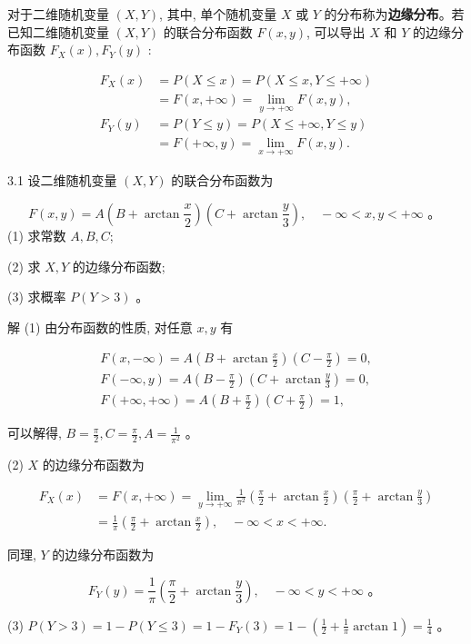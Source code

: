 \documentclass{beamer}
\begin{document}
	\begin{frame}
		对于二维随机变量 $(X, Y)$, 其中, 单个随机变量 $X$ 或 $Y$ 的分布称为\textbf{边缘分布}。若 已知二维随机变量 $(X, Y)$ 的联合分布函数 $F(x, y)$, 可以导出 $X$ 和 $Y$ 的边缘分布函数 $F_{X}(x), F_{Y}(y)$ :
		
		$$
		\begin{aligned}
			F_{X}(x) & =P(X \leqslant x)=P(X \leqslant x, Y \leqslant+\infty) \\
			& =F(x,+\infty)=\lim _{y \rightarrow+\infty} F(x, y), \\
			F_{Y}(y) & =P(Y \leqslant y)=P(X \leqslant+\infty, Y \leqslant y) \\
			& =F(+\infty, y)=\lim _{x \rightarrow+\infty} F(x, y) .
		\end{aligned}
		$$
	\end{frame}
	 
	\begin{frame}
		3.1 设二维随机变量 $(X, Y)$ 的联合分布函数为
		
		$$
		F(x, y)=A\left(B+\arctan \frac{x}{2}\right)\left(C+\arctan \frac{y}{3}\right), \quad-\infty<x, y<+\infty \text { 。 }
		$$
		(1) 求常数 $A, B, C$; 
		
		(2) 求 $X, Y$ 的边缘分布函数;
		
		(3) 求概率 $P(Y>3)$ 。
	\end{frame}
	
	\begin{frame}
		解 (1) 由分布函数的性质, 对任意 $x, y$ 有
		
		$$
		\begin{gathered}
			F(x,-\infty)=A\left(B+\arctan \frac{x}{2}\right)\left(C-\frac{\pi}{2}\right)=0, \\
			F(-\infty, y)=A\left(B-\frac{\pi}{2}\right)\left(C+\arctan \frac{y}{3}\right)=0, \\
			F(+\infty,+\infty)=A\left(B+\frac{\pi}{2}\right)\left(C+\frac{\pi}{2}\right)=1,
		\end{gathered}
		$$
		
		可以解得, $B=\frac{\pi}{2}, C=\frac{\pi}{2}, A=\frac{1}{\pi^{2}}$ 。
		
		(2) $X$ 的边缘分布函数为
		
		$$
		\begin{aligned}
			F_{X}(x) & =F(x,+\infty)=\lim _{y \rightarrow+\infty} \frac{1}{\pi^{2}}\left(\frac{\pi}{2}+\arctan \frac{x}{2}\right)\left(\frac{\pi}{2}+\arctan \frac{y}{3}\right) \\
			& =\frac{1}{\pi}\left(\frac{\pi}{2}+\arctan \frac{x}{2}\right), \quad-\infty<x<+\infty .
		\end{aligned}
		$$
		
		同理, $Y$ 的边缘分布函数为
		
		$$
		F_{Y}(y)=\frac{1}{\pi}\left(\frac{\pi}{2}+\arctan \frac{y}{3}\right), \quad-\infty<y<+\infty \text { 。 }
		$$
		
		
	\end{frame}
	\begin{frame}
		(3) $P(Y>3)=1-P(Y \leqslant 3)=1-F_{Y}(3)=1-\left(\frac{1}{2}+\frac{1}{\pi} \arctan 1\right)=\frac{1}{4}$ 。
	\end{frame}
	
\end{document}
